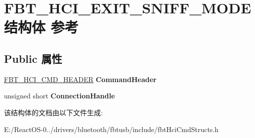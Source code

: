 \hypertarget{struct_f_b_t___h_c_i___e_x_i_t___s_n_i_f_f___m_o_d_e}{}\section{F\+B\+T\+\_\+\+H\+C\+I\+\_\+\+E\+X\+I\+T\+\_\+\+S\+N\+I\+F\+F\+\_\+\+M\+O\+D\+E结构体 参考}
\label{struct_f_b_t___h_c_i___e_x_i_t___s_n_i_f_f___m_o_d_e}
\subsection*{Public 属性}
\begin{DoxyCompactItemize}
\item 
\mbox{\label{struct_f_b_t___h_c_i___e_x_i_t___s_n_i_f_f___m_o_d_e_adf61df2ef5192d075d0905b0a0eed812}} 
\hyperlink{struct_f_b_t___h_c_i___c_m_d___h_e_a_d_e_r}{F\+B\+T\+\_\+\+H\+C\+I\+\_\+\+C\+M\+D\+\_\+\+H\+E\+A\+D\+ER} {\bfseries Command\+Header}
\item 
\mbox{\label{struct_f_b_t___h_c_i___e_x_i_t___s_n_i_f_f___m_o_d_e_ad7d15d056c4a72f6016c6cbe703a0ed8}} 
unsigned short {\bfseries Connection\+Handle}
\end{DoxyCompactItemize}


该结构体的文档由以下文件生成\+:\begin{DoxyCompactItemize}
\item 
E\+:/\+React\+O\+S-\/0../drivers/bluetooth/fbtusb/include/fbt\+Hci\+Cmd\+Structs.\+h\end{DoxyCompactItemize}
